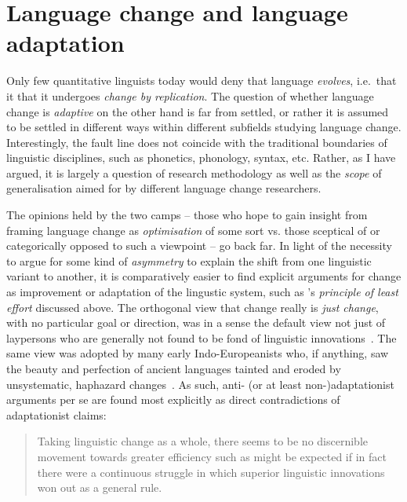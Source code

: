 \section{Language change and language adaptation}\label{sec:adaptationism}

Only few quantitative linguists today would deny that language \emph{evolves}, i.e.~that it that it undergoes \emph{change by replication}. The question of whether language change is \emph{adaptive} on the other hand is far from settled, or rather it is assumed to be settled in different ways within different subfields studying language change. Interestingly, the fault line does not coincide with the traditional boundaries of linguistic disciplines, such as phonetics, phonology, syntax, etc. Rather, as I have argued, it is largely a question of research methodology as well as the \emph{scope} of generalisation aimed for by different language change researchers.

The opinions held by the two camps -- those who hope to gain insight from framing language change as \emph{optimisation} of some sort vs. those sceptical of or categorically opposed to such a viewpoint -- go back far.
In light of the necessity to argue for some kind of \emph{asymmetry} to explain the shift from one linguistic variant to another, it is comparatively easier to find explicit arguments for change as improvement or adaptation of the lingustic system, such as \citet{Zipf1949}'s \emph{principle of least effort} discussed above.
The orthogonal view that change really is \emph{just change}, with no particular goal or direction, was in a sense the default view not just of laypersons who are generally not found to be fond of linguistic innovations~\citep{Labov2001}. The same view was adopted by many early Indo-Europeanists who, if anything, saw the beauty and perfection of ancient languages tainted and eroded by unsystematic, haphazard changes~\citep[ch.II]{Jespersen1922}. As such, anti- (or at least non-)adaptationist arguments per se are found most explicitly as direct contradictions of adaptationist claims:

\begin{quote}
Taking linguistic change as a whole, there seems to be no discernible movement towards greater efficiency such as might be expected if in fact there were a continuous struggle in which superior linguistic innovations won out as a general rule.~\citep[p.69]{Greenberg1959}
\end{quote}

